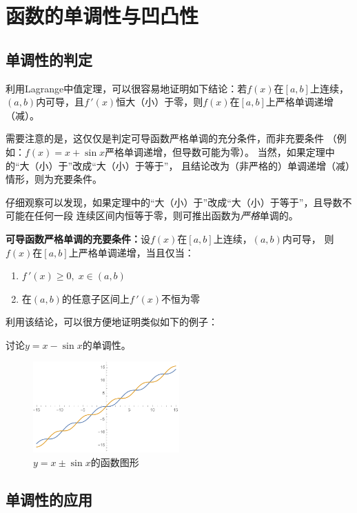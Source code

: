 \section{函数的单调性与凹凸性}

\subsection{单调性的判定}

利用Lagrange中值定理，可以很容易地证明如下结论：若$f(x)$在$[a,b]$上连续，
$(a,b)$内可导，且$f\,'(x)$恒大（小）于零，则$f(x)$在$[a,b]$上严格单调递增（减）。

需要注意的是，这仅仅是判定可导函数严格单调的充分条件，而非充要条件
（例如：$f(x)=x+\sin x$严格单调递增，但导数可能为零）。
当然，如果定理中的“大（小）于”改成“大（小）于等于”，
且结论改为（非严格的）单调递增（减）情形，则为充要条件。

仔细观察可以发现，如果定理中的“大（小）于”改成“大（小）于等于”，且导数不可能在任何一段
连续区间内恒等于零，则可推出函数为{\it 严格}单调的。

\begin{thx}
	{\bf 可导函数严格单调的充要条件：}设$f(x)$在$[a,b]$上连续，$(a,b)$内可导，
	则$f(x)$在$[a,b]$上严格单调递增，当且仅当：
	\begin{enumerate}[(1)]
	  \item $f\,'(x)\geq 0,\;x\in(a,b)$
	  \item 在$(a,b)$的任意子区间上$f\,'(x)$不恒为零
	\end{enumerate}
\end{thx}

利用该结论，可以很方便地证明类似如下的例子：

\egz 讨论$y=x-\sin x$的单调性。

\begin{figure}[h]
	\centering
	\includegraphics[width=0.5\textwidth]
	{./Images/Ch03/xpmSinx.pdf}
	\caption{$y=x\pm\sin x$的函数图形}
	\label{fig:xpmSinx}
\end{figure}

\subsection{单调性的应用}

